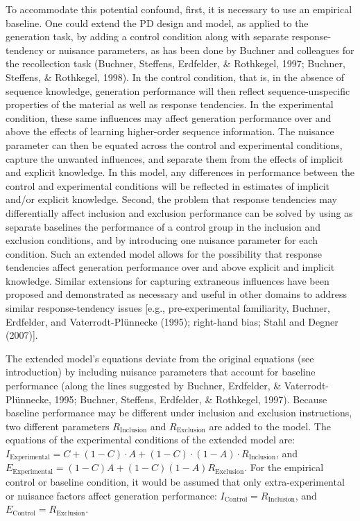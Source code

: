 \documentclass[
  english,
  man]{apa6}
\begin{document}
To accommodate this potential confound, first, it is necessary to use an empirical baseline.
One could extend the PD design and model, as applied to the generation task, by adding a control condition along with separate response-tendency or nuisance parameters, as has been done by Buchner and colleagues for the recollection task (Buchner, Steffens, Erdfelder, \& Rothkegel, 1997; Buchner, Steffens, \& Rothkegel, 1998).
In the control condition, that is, in the absence of sequence knowledge, generation performance will then reflect sequence-unspecific properties of the material as well as response tendencies.
In the experimental condition, these same influences may affect generation performance over and above the effects of learning higher-order sequence information.
The nuisance parameter can then be equated across the control and experimental conditions, capture the unwanted influences, and separate them from the effects of implicit and explicit knowledge.
In this model, any differences in performance between the control and experimental conditions will be reflected in estimates of implicit and/or explicit knowledge.
Second, the problem that response tendencies may differentially affect inclusion and exclusion performance can be solved by using as separate baselines the performance of a control group in the inclusion and exclusion conditions, and by introducing one nuisance parameter for each condition.
Such an extended model allows for the possibility that response tendencies affect generation performance over and above explicit and implicit knowledge.
Similar extensions for capturing extraneous influences have been proposed and demonstrated as necessary and useful in other domains to address similar response-tendency issues {[}e.g., pre-experimental familiarity, Buchner, Erdfelder, and Vaterrodt-Plünnecke (1995); right-hand bias; Stahl and Degner (2007){]}.

The extended model's equations deviate from the original equations (see introduction) by including nuisance parameters that account for baseline performance (along the lines suggested by Buchner, Erdfelder, \& Vaterrodt-Plünnecke, 1995; Buchner, Steffens, Erdfelder, \& Rothkegel, 1997).
Because baseline performance may be different under inclusion and exclusion instructions, two different parameters \(R_{\mathrm{Inclusion}}\) and \(R_{\mathrm{Exclusion}}\) are added to the model.
The equations of the experimental conditions of the extended model are:
\(I_\mathrm{Experimental} = C + (1-C) \cdot A + (1-C) \cdot (1-A) \cdot R_{\mathrm{Inclusion}}\),
and
\(E_\mathrm{Experimental} = (1-C)A + (1-C)(1-A)R_{\mathrm{Exclusion}}\).
For the empirical control or baseline condition, it would be assumed that only extra-experimental or nuisance factors affect generation performance:
\(I_\mathrm{Control} = R_{\mathrm{Inclusion}}\),
and
\(E_\mathrm{Control} = R_{\mathrm{Exclusion}}\).
\end{document}
